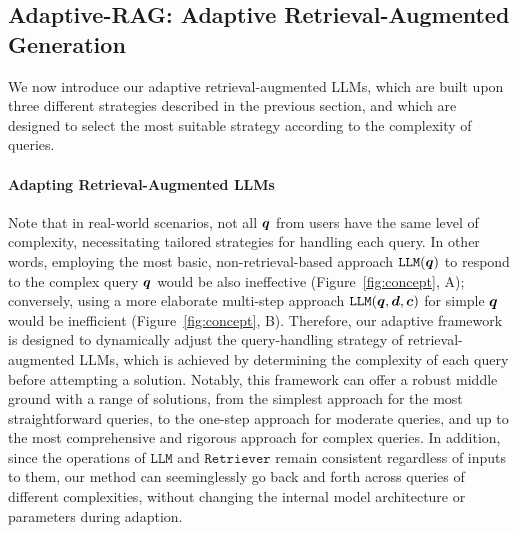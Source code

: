 \subsection{Adaptive-RAG: Adaptive Retrieval-Augmented Generation}
\label{method:ours}

We now introduce our adaptive retrieval-augmented LLMs, which are built upon three different strategies described in the previous section, and which are designed to select the most suitable strategy according to the complexity of queries.



\paragraph{Adapting Retrieval-Augmented LLMs}
Note that in real-world scenarios, not all ${\bm{q}}$ from users have the same level of complexity, necessitating tailored strategies for handling each query. In other words, employing the most basic, non-retrieval-based approach $\texttt{LLM}({\bm{q}})$ to respond to the complex query ${\bm{q}}$ would be also ineffective (Figure~\ref{fig:concept}, A); conversely, using a more elaborate multi-step approach $ \texttt{LLM}({\bm{q}}, {\bm{d}}, {\bm{c}})$ for simple ${\bm{q}}$ would be inefficient (Figure~\ref{fig:concept}, B). Therefore, our adaptive framework is designed to dynamically adjust the query-handling strategy of retrieval-augmented LLMs, which is achieved by determining the complexity of each query before attempting a solution. Notably, this framework can offer a robust middle ground with a range of solutions, from the simplest approach for the most straightforward queries, to the one-step approach for moderate queries, and up to the most comprehensive and rigorous approach for complex queries. In addition, since the operations of $\texttt{LLM}$ and $\texttt{Retriever}$ remain consistent regardless of inputs to them, our method can seeminglessly go back and forth across queries of different complexities, without changing the internal model architecture or parameters during adaption.


